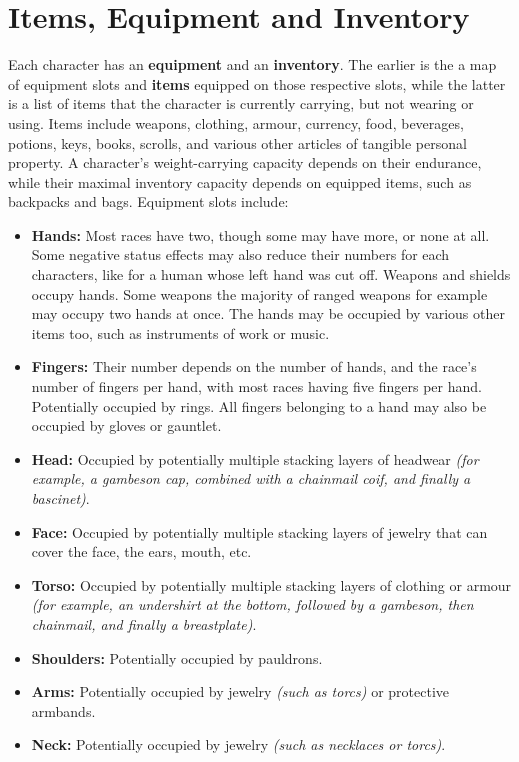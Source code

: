 \documentclass[tikz,openany,11pt,a4paper]{book}
\begin{document}
\section{Items, Equipment and Inventory}
Each character has an \textbf{equipment} and an \textbf{inventory}. The earlier is the a map of equipment slots and \textbf{items} equipped on those respective slots, while the latter is a list of items that the character is currently carrying, but not wearing or using.\newline
Items include weapons, clothing, armour, currency, food, beverages, potions, keys, books, scrolls, and various other articles of tangible personal property. A character's weight-carrying capacity depends on their endurance, while their maximal inventory capacity depends on equipped items, such as backpacks and bags. Equipment slots include:
\begin{itemize}
\item \textbf{Hands:} Most races have two, though some may have more, or none at all. Some negative status effects may also reduce their numbers for each characters, like for a human whose left hand was cut off. Weapons and shields occupy hands. Some weapons \textemdash the majority of ranged weapons for example \textemdash may occupy two hands at once. The hands may be occupied by various other items too, such as instruments of work or music.
\item \textbf{Fingers:} Their number depends on the number of hands, and the race's number of fingers per hand, with most races having five fingers per hand. Potentially occupied by rings. All fingers belonging to a hand may also be occupied by gloves or gauntlet.
\item \textbf{Head:} Occupied by potentially multiple stacking layers of headwear \textit{(for example, a gambeson cap, combined with a chainmail coif, and finally a bascinet)}.
\item \textbf{Face:} Occupied by potentially multiple stacking layers of jewelry that can cover the face, the ears, mouth, etc.
\item \textbf{Torso:} Occupied by potentially multiple stacking layers of clothing or armour \textit{(for example, an undershirt at the bottom, followed by a gambeson, then chainmail, and finally a breastplate)}.
\item \textbf{Shoulders:} Potentially occupied by pauldrons.
\item \textbf{Arms:} Potentially occupied by jewelry \textit{(such as torcs)} or protective armbands.
\item \textbf{Neck:} Potentially occupied by jewelry \textit{(such as necklaces or torcs)}.

\end{itemize}
\end{document}
